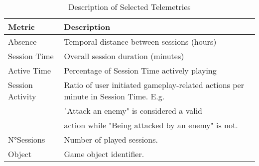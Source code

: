 \begin{table}[H] \centering
\caption{Description of Selected Telemetries}
\label{metricsdescription_3}
  \begin{tabularx}{\textwidth}{@{}lX@{}}
    \toprule
    \textbf{Metric}      & \textbf{Description}          \\ \midrule
    {Absence}    & Temporal distance between sessions (hours)  \\
    {Session Time}     & Overall session duration (minutes)       \\ 
    {Active Time}      & Percentage of Session Time actively playing  \\ 
    {Session Activity}    & Ratio of user initiated gameplay-related actions per minute in Session Time. E.g.\\ 
                & "Attack an enemy" is considered a valid\\ 
                & action while "Being attacked by an enemy" is not.\\
    {N°Sessions}    & Number of played sessions.\\ 
    {Object}    &  Game object identifier.  \\
    \bottomrule
  \end{tabularx}
\end{table}